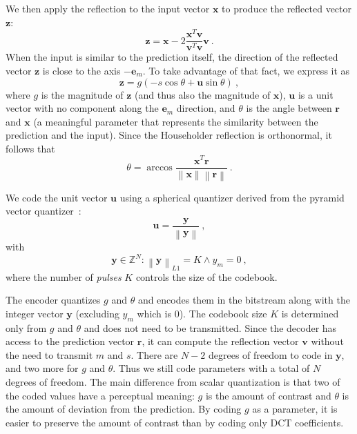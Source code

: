 \documentclass[english,conference,10pt]{IEEEtran}
\begin{document}
We then apply the reflection to the input vector
$\mathbf{x}$ to produce the reflected vector $\mathbf{z}$:
\begin{equation}
\mathbf{z} = \mathbf{x} - 2\frac{\mathbf{x}^T\mathbf{v}}
{\mathbf{v}^T\mathbf{v}}\mathbf{v}\ .
\end{equation}
When the input is similar to the prediction itself, the direction of the
reflected vector $\mathbf{z}$ is close to the axis $-\mathbf{e}_m$. To take
advantage of that fact, we express it as
\begin{equation}
\mathbf{z} = g\left(-s\cos\theta + \mathbf{u}\sin\theta\right)\ ,
\end{equation}
where $g$ is the magnitude of $\mathbf{z}$ (and thus also the magnitude of
$\mathbf{x}$), $\mathbf{u}$ is a unit vector with no component along the
$\mathbf{e}_m$ direction, and $\theta$ is the angle between $\mathbf{r}$ and
$\mathbf{x}$ (a meaningful parameter that represents the similarity between
the prediction and the input). Since the Householder reflection is orthonormal,
it follows that
\begin{equation}
\theta = \arccos\frac{\mathbf{x}^T\mathbf{r}}
                   {\left\|\mathbf{x}\right\|\left\|\mathbf{r}\right\|}\ .
\end{equation}

We code the unit vector $\mathbf{u}$ using a spherical quantizer derived
from the pyramid vector quantizer~\cite{Fischer1986}:
\begin{equation}
\mathbf{u}=\frac{\mathbf{y}}{\left\|\mathbf{y}\right\|}\ ,
\end{equation}
with
\begin{equation}
\mathbf{y} \in \mathbb{Z}^N : \left\|\mathbf{y}\right\|_{L1} = K \land y_m=0\ ,
\end{equation}
where the number of \textit{pulses} $K$ controls the size of the codebook.

The encoder quantizes $g$ and $\theta$ and encodes them in the bitstream along
with the integer vector $\mathbf{y}$ (excluding $y_m$ which is $0$). The codebook
size $K$ is determined only from $g$ and $\theta$ and does not need to be
transmitted. Since the decoder has access to the prediction vector $\mathbf{r}$,
it can compute the reflection vector $\mathbf{v}$ without the need to transmit
$m$ and $s$. There are $N-2$ degrees of freedom to code in
$\mathbf{y}$, and two more for $g$ and $\theta$. Thus we still code parameters
with a total of $N$ degrees of freedom. The main difference from scalar
quantization is that two of the
coded values have a perceptual meaning: $g$ is the amount of contrast and
$\theta$ is the amount of deviation from the prediction. By coding $g$
as a parameter, it is easier to preserve the amount of contrast than by
coding only DCT coefficients.
\end{document}
